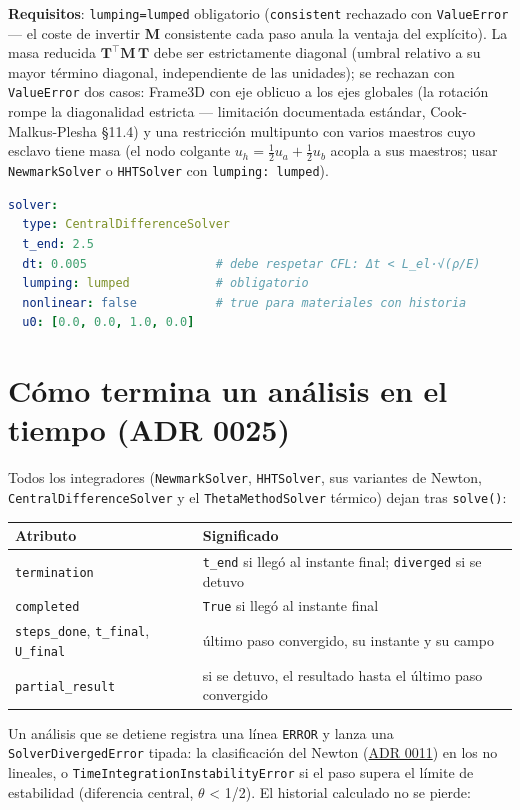 \documentclass[11pt,oneside]{report}
\begin{document}
\textbf{Requisitos}: \texttt{lumping=\textquotedbl{}lumped\textquotedbl{}} obligatorio (\texttt{\textquotedbl{}consistent\textquotedbl{}} rechazado con \texttt{ValueError} --- el coste de invertir $\mathbf M$ consistente cada paso anula la ventaja del explícito). La masa reducida $\mathbf T^\top\mathbf M\,\mathbf T$ debe ser estrictamente diagonal (umbral relativo a su mayor término diagonal, independiente de las unidades); se rechazan con \texttt{ValueError} dos casos: Frame3D con eje oblicuo a los ejes globales (la rotación rompe la diagonalidad estricta --- limitación documentada estándar, Cook-Malkus-Plesha §11.4) y una restricción multipunto con varios maestros cuyo esclavo tiene masa (el nodo colgante $u_h = \tfrac12 u_a + \tfrac12 u_b$ acopla a sus maestros; usar \texttt{NewmarkSolver} o \texttt{HHTSolver} con \texttt{lumping: lumped}).

\begin{lstlisting}[language=yaml]
solver:
  type: CentralDifferenceSolver
  t_end: 2.5
  dt: 0.005                  # debe respetar CFL: Δt < L_el·√(ρ/E)
  lumping: lumped            # obligatorio
  nonlinear: false           # true para materiales con historia
  u0: [0.0, 0.0, 1.0, 0.0]

\end{lstlisting}

\section{Cómo termina un análisis en el tiempo (ADR 0025)}

Todos los integradores (\texttt{NewmarkSolver}, \texttt{HHTSolver}, sus variantes de Newton, \texttt{CentralDifferenceSolver} y el \texttt{ThetaMethodSolver} térmico) dejan tras \texttt{solve()}:

\begin{center}
\begin{tabularx}{\textwidth}{YY}
\hline
\textbf{Atributo} & \textbf{Significado} \\
\hline
\texttt{termination} & \texttt{\textquotedbl{}t\_end\textquotedbl{}} si llegó al instante final; \texttt{\textquotedbl{}diverged\textquotedbl{}} si se detuvo \\
\texttt{completed} & \texttt{True} si llegó al instante final \\
\texttt{steps\_done}, \texttt{t\_final}, \texttt{U\_final} & último paso convergido, su instante y su campo \\
\texttt{partial\_result} & si se detuvo, el resultado hasta el último paso convergido \\
\hline
\end{tabularx}
\end{center}
Un análisis que se detiene registra una línea \texttt{ERROR} y lanza una \texttt{SolverDivergedError} tipada: la clasificación del Newton (\href{https://github.com/jretamav/solidum-fem/blob/main/docs/adr/0011-robustez-newton-line-search.md}{ADR 0011}) en los no lineales, o \texttt{TimeIntegrationInstabilityError} si el paso supera el límite de estabilidad (diferencia central, \ensuremath{\theta} \textless{} 1/2). El historial calculado no se pierde:
\end{document}
